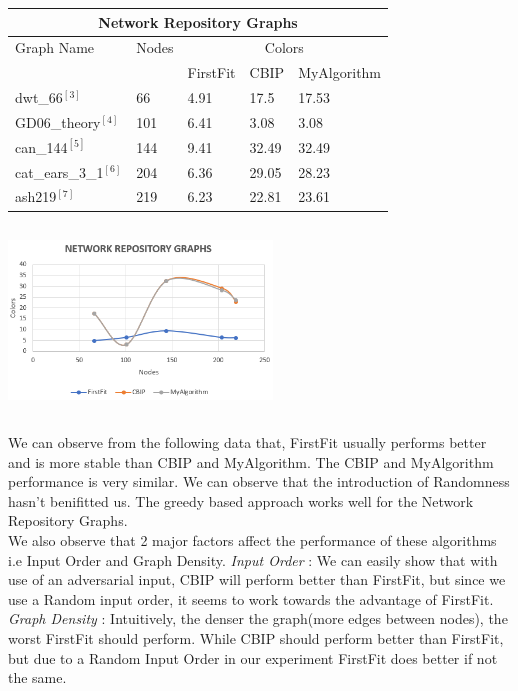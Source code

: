 \documentclass{article}
\begin{document}
\bigbreak
	\begin{minipage}{0.5\linewidth}
		 \begin{tabular}{||p{2.5cm} | p{0.8cm} | p{1.5cm} | p{1.5cm} | p{1.9cm} ||} 
			\hline
			\multicolumn{5}{|c|}{Network Repository Graphs} \\
			 \hline
			\hline
			Graph Name& Nodes & \multicolumn{3}{|c|}{Colors} \\
			\hline
 		 	& & FirstFit & CBIP & MyAlgorithm \\ [0.5ex] 
 			\hline\hline
			 dwt\_66$^{[3]}$& 66 & 4.91 & 17.5 & 17.53 \\ 
			 \hline
 			 GD06\_theory$^{[4]}$& 101 & 6.41 & 3.08 & 3.08 \\
 			\hline
			can\_144$^{[5]}$ & 144 & 9.41 & 32.49 & 32.49 \\
			 \hline
			 cat\_ears\_3\_1$^{[6]}$& 204 & 6.36 & 29.05 & 28.23 \\
 			\hline
 			ash219$^{[7]}$& 219 & 6.23 & 22.81 & 23.61\\ [1ex] 
 			\hline
		\end{tabular}
	\end{minipage}\hfill
	\begin{minipage}{5cm}
		\centering
		\includegraphics[height=5cm,width=7cm]{NetworkRepoGraph}
	\end{minipage}


We can observe from the following data that, FirstFit usually performs better and is more stable than CBIP and MyAlgorithm. The CBIP and 
MyAlgorithm performance is very similar. We can observe that the introduction of Randomness hasn't benifitted us. The greedy based approach
works well for the Network Repository Graphs. \\


We also observe that 2 major factors affect the performance of these algorithms i.e  Input Order and Graph Density.
\bigbreak
\textit{Input Order} : We can easily show that with use of an adversarial input, CBIP will perform better than FirstFit, but since we use a Random 
input order, it seems to work towards the advantage of FirstFit.\\
\bigbreak
\textit{Graph Density} : Intuitively, the denser the graph(more edges between nodes), the worst FirstFit should perform. While CBIP
should perform better than FirstFit, but due to a Random Input Order in our experiment FirstFit does better if not the same.\\ 
\end{document}

